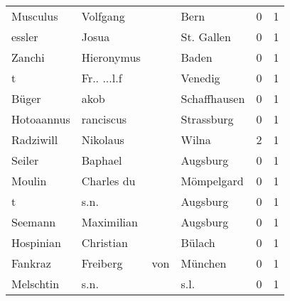 \documentclass[10pt,a4paper,landscape]{article}
\begin{document}
\begin{longtable}{llllrr}
                 Musculus &                           Volfgang &             &                                        Bern &          0 &         1 \\
                   essler &                              Josua &             &                                  St. Gallen &          0 &         1 \\
                   Zanchi &                         Hieronymus &             &                                       Baden &          0 &         1 \\
                        t &                        Fr.. ...l.f &             &                                     Venedig &          0 &         1 \\
                    Büger &                               akob &             &                                Schaffhausen &          0 &         1 \\
               Hotoaannus &                          ranciscus &             &                                  Strassburg &          0 &         1 \\
                Radziwill &                           Nikolaus &             &                                       Wilna &          2 &         1 \\
                   Seiler &                            Baphael &             &                                    Augsburg &          0 &         1 \\
                   Moulin &                         Charles du &             &                                  Mömpelgard &          0 &         1 \\
                        t &                               s.n. &             &                                    Augsburg &          0 &         1 \\
                  Seemann &                         Maximilian &             &                                    Augsburg &          0 &         1 \\
                Hospinian &                          Christian &             &                                      Bülach &          0 &         1 \\
                  Fankraz &                           Freiberg &         von &                                     München &          0 &         1 \\
                Melschtin &                               s.n. &             &                                        s.l. &          0 &         1 \\

\end{longtable}
\end{document}
